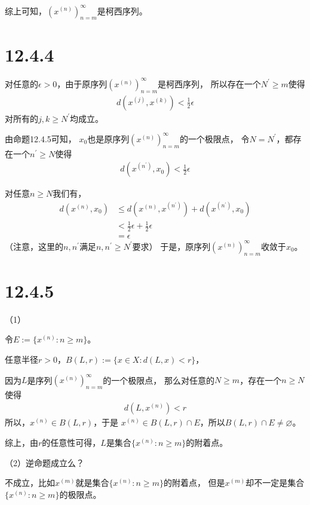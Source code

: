 \documentclass{article}
\begin{document}
综上可知，$(x^{(n)})_{n = m}^\infty$是柯西序列。

\section*{12.4.4}

对任意的$\epsilon > 0$，由于原序列$(x^{(n)})_{n = m}^\infty$是柯西序列，
所以存在一个$N^\prime \geq m$使得
\begin{align*}
  d(x^{(j)}, x^{(k)}) < \frac{1}{2}\epsilon
\end{align*}
对所有的$j,k \geq N^\prime$均成立。

由命题12.4.5可知， $x_0$也是原序列$(x^{(n)})_{n = m}^\infty$的一个极限点，
令$N = N^\prime$，都存在一个$n^\prime \geq N$使得
\begin{align*}
  d(x^{(n^\prime)}, x_0) < \frac{1}{2}\epsilon
\end{align*}

对任意$n \geq N$我们有，
\begin{align*}
  d(x^{(n)}, x_0) & \leq d(x^{(n)}, x^{(n^\prime)}) + d(x^{(n^\prime)}, x_0) \\
                  & < \frac{1}{2}\epsilon + \frac{1}{2}\epsilon              \\
                  & = \epsilon
\end{align*}
（注意，这里的$n, n^\prime$满足$n, n^\prime \geq N^\prime$要求）
于是，原序列$(x^{(n)})_{n = m}^\infty$收敛于$x_0$。

\section*{12.4.5}
（1）

令$E := \{x^{(n)}: n \geq m\}$。

任意半径$r > 0$，$B(L, r) := \{x \in X: d(L, x) < r\}$，

因为$L$是序列$(x^{(n)})_{n = m}^\infty$的一个极限点，
那么对任意的$N \geq m$，存在一个$n \geq N$使得
\begin{align*}
  d(L, x^{(n)}) < r
\end{align*}
所以，$x^{(n)} \in B(L, r)$，于是
$x^{(n)} \in B(L, r) \cap E$，所以$B(L, r) \cap E \neq \varnothing$。

综上，由$r$的任意性可得，$L$是集合$\{x^{(n)}: n \geq m\}$的附着点。

（2）逆命题成立么？

不成立，比如$x^{(m)}$就是集合$\{x^{(n)}: n \geq m\}$的附着点，
但是$x^{(m)}$却不一定是集合$\{x^{(n)}: n \geq m\}$的极限点。
\end{document}
